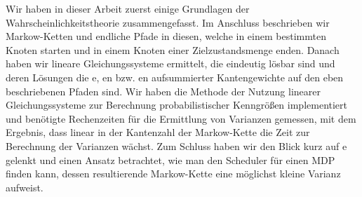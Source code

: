 \documentclass[a4paper]{article}
\newcommand{\mc}{Markow-Kette}
\theoremstyle{nonumberplain}
\begin{document}
Wir haben in dieser Arbeit zuerst einige Grundlagen der Wahrscheinlichkeitstheorie zusammengefasst. Im Anschluss beschrieben wir \mc{}n und endliche Pfade in diesen, welche in einem bestimmten Knoten starten und in einem Knoten einer Zielzustandsmenge enden. Danach haben wir lineare Gleichungssysteme ermittelt, die eindeutig lösbar sind und deren Lösungen die \expect{}e, \var{}en bzw. \cov{}en aufsummierter Kantengewichte auf den eben beschriebenen Pfaden sind.
Wir haben die Methode der Nutzung linearer Gleichungssysteme zur Berechnung probabilistischer Kenngrößen implementiert und benötigte Rechenzeiten für die Ermittlung von Varianzen gemessen, mit dem Ergebnis, dass linear in der Kantenzahl der \mc{} die Zeit zur Berechnung der Varianzen wächst. Zum Schluss haben wir den Blick kurz auf \mdp{}e gelenkt und einen Ansatz betrachtet, wie man den Scheduler für einen MDP finden kann, dessen resultierende \mc{} eine möglichst kleine Varianz aufweist.
\end{document}
